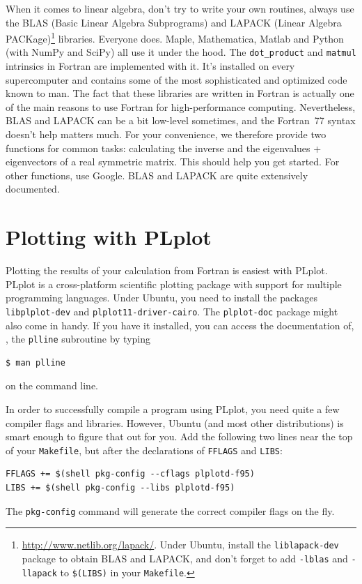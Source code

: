 \documentclass[openany,oneside]{report}
\begin{document}
When it comes to linear algebra, don't try to write your own routines, always use the BLAS (Basic Linear Algebra Subprograms) and LAPACK (Linear Algebra PACKage)\footnote{\url{http://www.netlib.org/lapack/}.
Under Ubuntu, install the \texttt{liblapack-dev} package to obtain BLAS and LAPACK, and don't forget to add \texttt{-lblas} and \texttt{-llapack} to \texttt{\$(LIBS)} in your \texttt{Makefile}.} libraries.
Everyone does.
Maple, Mathematica, Matlab and Python (with NumPy and SciPy) all use it under the hood.
The \texttt{dot\_product} and \texttt{matmul} intrinsics in Fortran are implemented with it.
It's installed on every supercomputer and contains some of the most sophisticated and optimized code known to man.
The fact that these libraries are written in Fortran is actually one of the main reasons to use Fortran for high-performance computing.
Nevertheless, BLAS and LAPACK can be a bit low-level sometimes, and the Fortran~77 syntax doesn't help matters much.
For your convenience, we therefore provide two functions for common tasks: calculating the inverse and the eigenvalues + eigenvectors of a real symmetric matrix.
This should help you get started.
For other functions, use Google.
BLAS and LAPACK are quite extensively documented.




\chapter{Plotting with PLplot}
\label{chap:PLplot}

Plotting the results of your calculation from Fortran is easiest with PLplot.
PLplot is a cross-platform scientific plotting package with support for multiple programming languages.
Under Ubuntu, you need to install the packages \texttt{libplplot-dev} and \texttt{plplot11-driver-cairo}.
The \texttt{plplot-doc} package might also come in handy.
If you have it installed, you can access the documentation of, \eg, the \texttt{plline} subroutine by typing
\begin{verbatim}
$ man plline
\end{verbatim}
on the command line.

In order to successfully compile a program using PLplot, you need quite a few compiler flags and libraries.
However, Ubuntu (and most other distributions) is smart enough to figure that out for you.
Add the following two lines near the top of your \texttt{Makefile}, but after the declarations of \texttt{FFLAGS} and \texttt{LIBS}:
\begin{verbatim}
FFLAGS += $(shell pkg-config --cflags plplotd-f95)
LIBS += $(shell pkg-config --libs plplotd-f95)
\end{verbatim}
The \texttt{pkg-config} command will generate the correct compiler flags on the fly.
\end{document}
